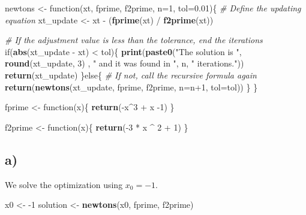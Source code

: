 \documentclass[]{article}
\newenvironment{Shaded}{\begin{snugshade}}{\end{snugshade}}
\newcommand{\KeywordTok}[1]{\textcolor[rgb]{0.13,0.29,0.53}{\textbf{{#1}}}}
\newcommand{\DataTypeTok}[1]{\textcolor[rgb]{0.13,0.29,0.53}{{#1}}}
\newcommand{\DecValTok}[1]{\textcolor[rgb]{0.00,0.00,0.81}{{#1}}}
\newcommand{\FloatTok}[1]{\textcolor[rgb]{0.00,0.00,0.81}{{#1}}}
\newcommand{\StringTok}[1]{\textcolor[rgb]{0.31,0.60,0.02}{{#1}}}
\newcommand{\CommentTok}[1]{\textcolor[rgb]{0.56,0.35,0.01}{\textit{{#1}}}}
\newcommand{\NormalTok}[1]{{#1}}
\begin{document}
\begin{Shaded}
\begin{Highlighting}[]
\NormalTok{newtons <-}\StringTok{ }\NormalTok{function(xt, fprime, f2prime, }\DataTypeTok{n=}\DecValTok{1}\NormalTok{, }\DataTypeTok{tol=}\FloatTok{0.01}\NormalTok{)\{}
  \CommentTok{# Define the updating equation}
  \NormalTok{xt_update <-}\StringTok{ }\NormalTok{xt -}\StringTok{ }\NormalTok{(}\KeywordTok{fprime}\NormalTok{(xt) /}\StringTok{ }\KeywordTok{f2prime}\NormalTok{(xt))}
  
  \CommentTok{# If the adjustment value is less than the tolerance, end the iterations}
  \NormalTok{if(}\KeywordTok{abs}\NormalTok{(xt_update -}\StringTok{ }\NormalTok{xt) <}\StringTok{ }\NormalTok{tol)\{}
    \KeywordTok{print}\NormalTok{(}\KeywordTok{paste0}\NormalTok{(}\StringTok{"The solution is "}\NormalTok{, }\KeywordTok{round}\NormalTok{(xt_update, }\DecValTok{3}\NormalTok{) , }\StringTok{" and it was found in "}\NormalTok{, n, }\StringTok{" iterations."}\NormalTok{))}
    \KeywordTok{return}\NormalTok{(xt_update)}
  \NormalTok{\}else\{}
    \CommentTok{# If not, call the recursive formula again}
    \KeywordTok{return}\NormalTok{(}\KeywordTok{newtons}\NormalTok{(xt_update, fprime, f2prime, }\DataTypeTok{n=}\NormalTok{n}\DecValTok{+1}\NormalTok{, }\DataTypeTok{tol=}\NormalTok{tol))}
  \NormalTok{\}}
\NormalTok{\}}

\NormalTok{fprime <-}\StringTok{ }\NormalTok{function(x)\{}
  \KeywordTok{return}\NormalTok{(-x^}\DecValTok{3} \NormalTok{+}\StringTok{ }\NormalTok{x -}\DecValTok{1}\NormalTok{)}
\NormalTok{\}}

\NormalTok{f2prime <-}\StringTok{ }\NormalTok{function(x)\{}
  \KeywordTok{return}\NormalTok{(-}\DecValTok{3} \NormalTok{*}\StringTok{ }\NormalTok{x ^}\StringTok{ }\DecValTok{2} \NormalTok{+}\StringTok{ }\DecValTok{1}\NormalTok{)}
\NormalTok{\}}
\end{Highlighting}
\end{Shaded}

\subsection{a)}\label{a-1}

We solve the optimization using \(x_0=-1\).

\begin{Shaded}
\begin{Highlighting}[]
\NormalTok{x0 <-}\StringTok{ }\NormalTok{-}\DecValTok{1}
\NormalTok{solution <-}\StringTok{ }\KeywordTok{newtons}\NormalTok{(x0, fprime, f2prime)}
\end{Highlighting}
\end{Shaded}
\end{document}
